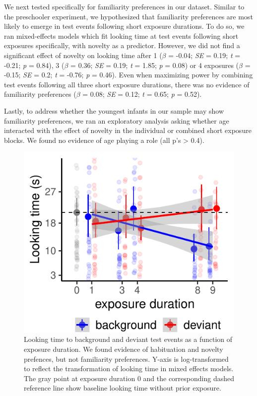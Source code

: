 \documentclass[10pt, letterpaper]{article}
\newenvironment{CodeChunk}{}{}
\begin{document}
We next tested specifically for familiarity preferences in our dataset.
Similar to the preschooler experiment, we hypothesized that familiarity
preferences are most likely to emerge in test events following short
exposure durations. To do so, we ran mixed-effects models which fit
looking time at test events following short exposures specifically, with
novelty as a predictor. However, we did not find a significant effect of
novelty on looking time after 1 (\(\beta\) = -0.04; \emph{SE} = 0.19;
\emph{t} = -0.21; \emph{p} = 0.84), 3 (\(\beta\) = 0.36; \emph{SE} =
0.19; \emph{t} = 1.85; \emph{p} = 0.08) or 4 exposures (\(\beta\) =
-0.15; \emph{SE} = 0.2; \emph{t} = -0.76; \emph{p} = 0.46). Even when
maximizing power by combining test events following all three short
exposure durations, there was no evidence of familiarity preferences
(\(\beta\) = 0.08; \emph{SE} = 0.12; \emph{t} = 0.65; \emph{p} = 0.52).

Lastly, to address whether the youngest infants in our sample may show
familiarity preferences, we ran an exploratory analysis asking whether
age interacted with the effect of novelty in the individual or combined
short exposure blocks. We found no evidence of age playing a role (all
p's \textgreater{} 0.4).

\captionsetup{belowskip=45pt,aboveskip=4pt}

\begin{CodeChunk}
\begin{figure}[h]

\includegraphics{figs/infant_results-1} \hfill{}

\caption[Looking time to background and deviant test events as a function of exposure duration]{Looking time to background and deviant test events as a function of exposure duration. We found evidence of habituation and novelty prefences, but not familiarity preferences. Y-axis is log-transformed to reflect the transformation of looking time in mixed effects models. The gray point at exposure duration 0 and the corresponding dashed reference line show baseline looking time without prior exposure.}\label{fig:infant_results}
\end{figure}
\end{CodeChunk}
\end{document}
